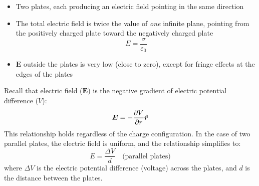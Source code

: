 \begin{itemize}
\item Two plates, each producing an electric field pointing in
  the same direction
\item The total electric field is twice the value of \emph{one} infinite
  plane, pointing from the positively charged plate toward the negatively
  charged plate
  \begin{equation}
    \boxed{E=\frac\sigma{\varepsilon_0}}
  \end{equation}
\item $\bm E$ outside the plates is very low (close to zero), except for
  fringe effects at the edges of the plates
\end{itemize}
Recall that electric field ($\bm E$) is the negative gradient of electric
potential difference ($V$):
\begin{equation*}
  \bm E=-\diffp Vr\hat{\bm r}
\end{equation*}
This relationship holds regardless of the charge configuration. In the case of
two parallel plates, the electric field is uniform, and the relationship
simplifies to:
\begin{equation}
  \boxed{E=\frac{\Delta V}d\quad\text{(parallel plates)}}
\end{equation}
where $\Delta V$ is the electric potential difference (voltage) across the
plates, and $d$ is the distance between the plates.
%        
%
%        
